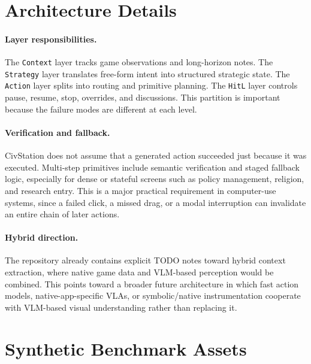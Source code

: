 \section{Architecture Details}

\paragraph{Layer responsibilities.}
The \texttt{Context} layer tracks game observations and long-horizon notes. The \texttt{Strategy} layer translates free-form intent into structured strategic state. The \texttt{Action} layer splits into routing and primitive planning. The \texttt{HitL} layer controls pause, resume, stop, overrides, and discussions. This partition is important because the failure modes are different at each level.

\paragraph{Verification and fallback.}
CivStation does not assume that a generated action succeeded just because it was executed. Multi-step primitives include semantic verification and staged fallback logic, especially for dense or stateful screens such as policy management, religion, and research entry. This is a major practical requirement in computer-use systems, since a failed click, a missed drag, or a modal interruption can invalidate an entire chain of later actions.

\paragraph{Hybrid direction.}
The repository already contains explicit TODO notes toward hybrid context extraction, where native game data and VLM-based perception would be combined. This points toward a broader future architecture in which fast action models, native-app-specific VLAs, or symbolic/native instrumentation cooperate with VLM-based visual understanding rather than replacing it.

\section{Synthetic Benchmark Assets}

